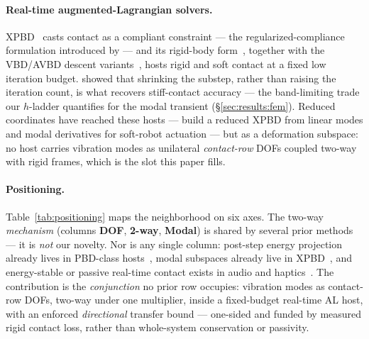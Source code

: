 \paragraph*{Real-time augmented-Lagrangian solvers.}
XPBD~\citep{macklin2016xpbd} casts contact as a compliant constraint --- the
regularized-compliance formulation introduced by \citet{tournier2015stable} ---
and its rigid-body form~\citep{mueller2020xpbd}, together with the VBD/AVBD
descent variants~\citep{chen2024vbd,giles2025avbd}, hosts rigid and soft contact
at a fixed low iteration budget. \citet{macklin2019small} showed that shrinking
the substep, rather than raising the iteration count, is what recovers
stiff-contact accuracy --- the band-limiting trade our $h$-ladder quantifies for
the modal transient (\S\ref{sec:results:fem}). Reduced coordinates have reached
these hosts --- \citet{peng2024reduced} build a reduced XPBD from linear modes
and modal derivatives for soft-robot actuation --- but as a deformation
subspace: no host carries vibration modes as unilateral \emph{contact-row} DOFs
coupled two-way with rigid frames, which is the slot this paper fills.

\paragraph*{Positioning.} Table~\ref{tab:positioning} maps the neighborhood on six
axes. The two-way \emph{mechanism} (columns \textbf{DOF}, \textbf{2-way},
\textbf{Modal}) is shared by several prior methods --- it is \emph{not} our
novelty. Nor is any single column: post-step energy projection already lives in
PBD-class hosts~\citep{dinev2018fepr}, modal subspaces already live in
XPBD~\citep{peng2024reduced}, and energy-stable or passive real-time contact
exists in audio and haptics~\citep{rath2008,kim2017pmi}. The contribution is the
\emph{conjunction} no prior row occupies: vibration modes as contact-row DOFs,
two-way under one multiplier, inside a fixed-budget real-time AL host, with an
enforced \emph{directional} transfer bound --- one-sided and funded by measured
rigid contact loss, rather than whole-system conservation or passivity.

